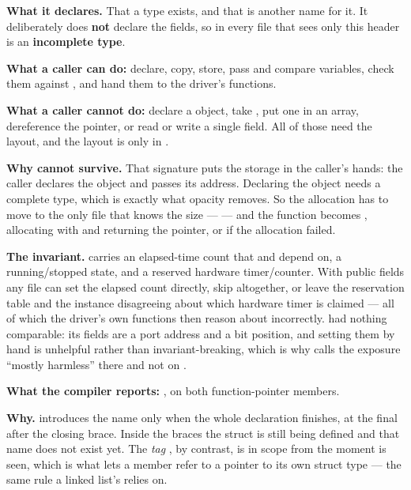 
\textbf{What it declares.} That a type  exists, and that  is another
name for it. It deliberately does \textbf{not} declare the fields, so in every file that sees only
this header  is an \textbf{incomplete type}. 

\textbf{What a caller can do:} declare, copy, store, pass and compare  variables,
check them against , and hand them to the driver's functions.

\textbf{What a caller cannot do:} declare a  object, take , put
one in an array, dereference the pointer, or read or write a single field. All of those need the
layout, and the layout is only in . 

\textbf{Why  cannot survive.} That signature puts the storage in
the caller's hands: the caller declares the object and passes its address. Declaring the object
needs a complete type, which is exactly what opacity removes. So the allocation has to move to the
only file that knows the size ---  --- and the function becomes
, allocating with  and returning the pointer, or 
if the allocation failed. 

\textbf{The invariant.}  carries an elapsed-time count that  and
 depend on, a running/stopped state, and a reserved hardware timer/counter.
With public fields any file can set the elapsed count directly, skip 
altogether, or leave the reservation table and the instance disagreeing about which hardware timer
is claimed --- all of which the driver's own functions then reason about incorrectly. 
had nothing comparable: its fields are a port address and a bit position, and setting them by hand
is unhelpful rather than invariant-breaking, which is why  calls the exposure
``mostly harmless'' there and not on . 

\textbf{What the compiler reports: }, on both function-pointer
members. 

\textbf{Why.}  introduces the name  only when
the whole declaration finishes, at the final \code{;} after the closing brace. Inside the braces the
struct is still being defined and that name does not exist yet. The \emph{tag} ,
by contrast, is in scope from the moment  is seen, which is what lets a member
refer to a pointer to its own struct type --- the same rule a linked list's
 relies on. 

